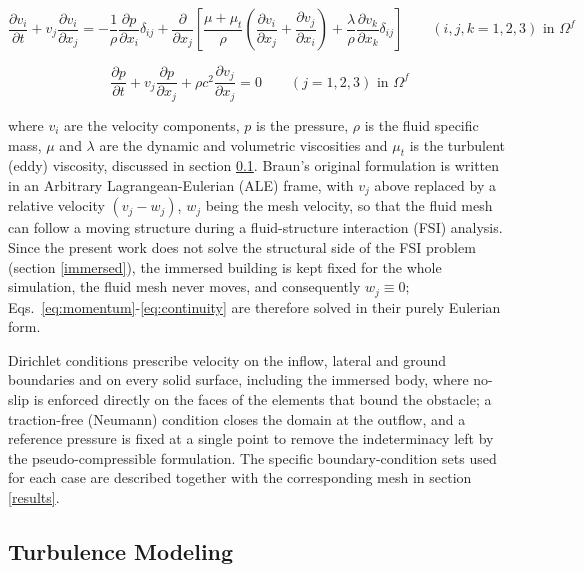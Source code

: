 \documentclass{article}
\begin{document}
\begin{equation}
\frac{\partial v_i}{\partial t} + v_j \frac{\partial v_i}{\partial x_j} = -\frac{1}{\rho}\frac{\partial p}{\partial x_i}\delta_{ij} + \frac{\partial}{\partial x_j}\left[\frac{\mu+\mu_t}{\rho}\left(\frac{\partial v_i}{\partial x_j}+\frac{\partial v_j}{\partial x_i}\right) + \frac{\lambda}{\rho}\frac{\partial v_k}{\partial x_k}\delta_{ij}\right] \qquad (i,j,k=1,2,3) \text{ in } \Omega^f
\label{eq:momentum}
\end{equation}

\begin{equation}
\frac{\partial p}{\partial t} + v_j \frac{\partial p}{\partial x_j} + \rho c^2 \frac{\partial v_j}{\partial x_j} = 0 \qquad (j=1,2,3) \text{ in } \Omega^f
\label{eq:continuity}
\end{equation}

where $v_i$ are the velocity components, $p$ is the pressure, $\rho$ is the fluid specific mass, $\mu$ and $\lambda$ are the dynamic and volumetric viscosities and $\mu_t$ is the turbulent (eddy) viscosity, discussed in section \ref{turb}. Braun's original formulation \cite{braun09} is written in an Arbitrary Lagrangean-Eulerian (ALE) frame, with $v_j$ above replaced by a relative velocity $(v_j - w_j)$, $w_j$ being the mesh velocity, so that the fluid mesh can follow a moving structure during a fluid-structure interaction (FSI) analysis. Since the present work does not solve the structural side of the FSI problem (section \ref{immersed}), the immersed building is kept fixed for the whole simulation, the fluid mesh never moves, and consequently $w_j \equiv 0$; Eqs.~\eqref{eq:momentum}-\eqref{eq:continuity} are therefore solved in their purely Eulerian form.

Dirichlet conditions prescribe velocity on the inflow, lateral and ground boundaries and on every solid surface, including the immersed body, where no-slip is enforced directly on the faces of the elements that bound the obstacle; a traction-free (Neumann) condition closes the domain at the outflow, and a reference pressure is fixed at a single point to remove the indeterminacy left by the pseudo-compressible formulation. The specific boundary-condition sets used for each case are described together with the corresponding mesh in section \ref{results}.

\subsection{Turbulence Modeling} \label{turb}
\end{document}

